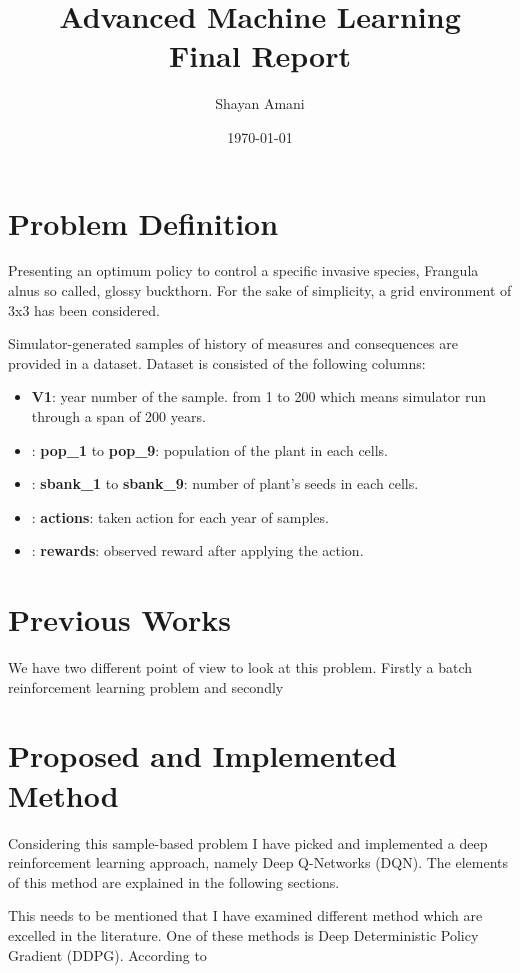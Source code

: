 \documentclass[12pt]{report}
\title{Advanced Machine Learning\\Final Report}
\author{Shayan Amani}
\date{\today}
\begin{document}
\maketitle

\chapter{Problem Definition}
Presenting an optimum policy to control a specific invasive species, Frangula alnus so called, glossy buckthorn. For the sake of simplicity, a grid environment of 3x3 has been considered. 

Simulator-generated samples of history of measures and consequences are provided in a dataset. Dataset is consisted of the following columns:
\begin{itemize}
    \item \textbf{V1}: year number of the sample. from 1 to 200 which means simulator run through a span of 200 years.
    \item: \textbf{pop\_1} to \textbf{pop\_9}: population of the plant in each cells.
    \item: \textbf{sbank\_1} to \textbf{sbank\_9}: number of plant's seeds in each cells.
    \item: \textbf{actions}: taken action for each year of samples.
    \item: \textbf{rewards}: observed reward after applying the action.
\end{itemize}

\chapter{Previous Works}
We have two different point of view to look at this problem. Firstly a batch reinforcement learning problem and secondly



\chapter{Proposed and Implemented Method}
Considering this sample-based problem I have picked and implemented a deep reinforcement learning approach, namely Deep Q-Networks (DQN). The elements of this method are explained in the following sections.

This needs to be mentioned that I have examined different method which are excelled in the literature. One of these methods is Deep Deterministic Policy Gradient (DDPG). According to \citet{}
\end{document}
